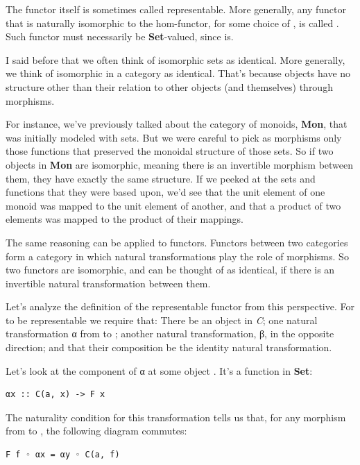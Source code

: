 The functor  itself is sometimes called representable.
More generally, any functor  that is naturally isomorphic to
the hom-functor, for some choice of , is called
. Such functor must necessarily be
\textbf{Set}-valued, since  is.

I said before that we often think of isomorphic sets as identical. More
generally, we think of isomorphic  in a category as
identical. That's because objects have no structure other than their
relation to other objects (and themselves) through morphisms.

For instance, we've previously talked about the category of monoids,
\textbf{Mon}, that was initially modeled with sets. But we were careful
to pick as morphisms only those functions that preserved the monoidal
structure of those sets. So if two objects in \textbf{Mon} are
isomorphic, meaning there is an invertible morphism between them, they
have exactly the same structure. If we peeked at the sets and functions
that they were based upon, we'd see that the unit element of one monoid
was mapped to the unit element of another, and that a product of two
elements was mapped to the product of their mappings.

The same reasoning can be applied to functors. Functors between two
categories form a category in which natural transformations play the
role of morphisms. So two functors are isomorphic, and can be thought of
as identical, if there is an invertible natural transformation between
them.

Let's analyze the definition of the representable functor from this
perspective. For  to be representable we require that: There
be an object  in \emph{C}; one natural transformation α from
 to ; another natural transformation, β, in
the opposite direction; and that their composition be the identity
natural transformation.

Let's look at the component of α at some object . It's a
function in \textbf{Set}:

\begin{verbatim}
αx :: C(a, x) -> F x
\end{verbatim}

The naturality condition for this transformation tells us that, for any
morphism  from  to , the following diagram
commutes:

\begin{verbatim}
F f ◦ αx = αy ◦ C(a, f)
\end{verbatim}

